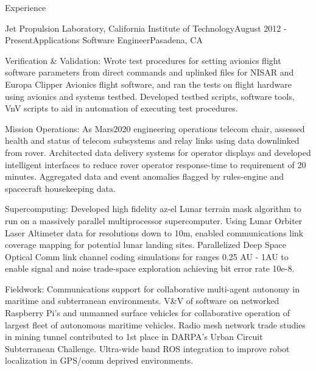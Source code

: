 \documentclass{resume} %
\begin{document}
\begin{rSection}{Experience}
\begin{rSubsection}{Jet Propulsion Laboratory, California Institute of Technology}{August 2012 - Present}{Applications Software Engineer}{Pasadena, CA}


\item {Verification \& Validation:} Wrote test procedures for setting avionics flight software parameters from direct commands and uplinked files for NISAR and Europa Clipper Avionics flight software, and ran the tests on flight hardware using avionics and systems testbed. Developed testbed scripts, software tools, VnV scripts to aid in automation of executing test procedures.

\item {Mission Operations:} As Mars2020 engineering operations telecom chair, assessed health and status of telecom subsystems and relay links using data downlinked from rover. Architected data delivery systems for operator displays and developed intelligent interfaces to reduce rover operator response-time to requirement of 20 minutes. Aggregated data and event anomalies flagged by rules-engine and spacecraft housekeeping data.


\item {Supercomputing:} Developed high fidelity az-el Lunar terrain mask algorithm to run on a massively parallel multiprocessor supercomputer. Using Lunar Orbiter Laser Altimeter data for resolutions down to 10m, enabled communications link coverage mapping for potential lunar landing sites. Parallelized Deep Space Optical Comm link channel coding simulations for ranges 0.25 AU - 1AU to enable signal and noise trade-space exploration achieving bit error rate 10e-8. 
 

\item {Fieldwork:} Communications support for collaborative multi-agent autonomy in maritime and subterranean environments. V\&V of software on networked Raspberry Pi’s and unmanned surface vehicles for collaborative operation of largest fleet of autonomous maritime vehicles. Radio mesh network trade studies in mining tunnel contributed to 1st place in DARPA’s Urban Circuit Subterranean Challenge. Ultra-wide band ROS integration to improve robot localization in GPS/comm deprived environments.



\end{rSubsection}
\end{rSection}
\end{document}
